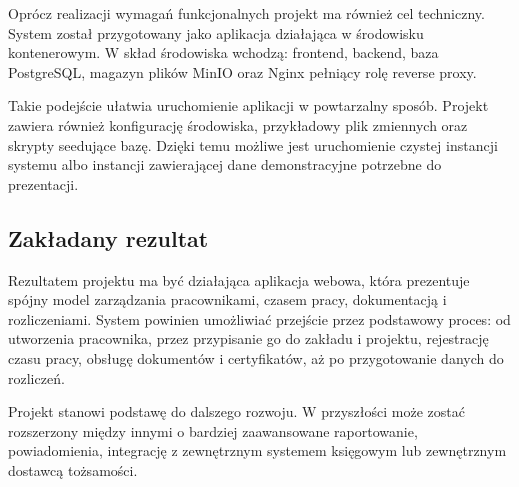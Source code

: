 Oprócz realizacji wymagań funkcjonalnych projekt ma również cel techniczny. System został przygotowany jako aplikacja działająca w środowisku kontenerowym. W skład środowiska wchodzą: frontend, backend, baza PostgreSQL, magazyn plików MinIO oraz Nginx pełniący rolę reverse proxy.

Takie podejście ułatwia uruchomienie aplikacji w powtarzalny sposób. Projekt zawiera również konfigurację środowiska, przykładowy plik zmiennych oraz skrypty seedujące bazę. Dzięki temu możliwe jest uruchomienie czystej instancji systemu albo instancji zawierającej dane demonstracyjne potrzebne do prezentacji.

\subsection{Zakładany rezultat}

Rezultatem projektu ma być działająca aplikacja webowa, która prezentuje spójny model zarządzania pracownikami, czasem pracy, dokumentacją i rozliczeniami. System powinien umożliwiać przejście przez podstawowy proces: od utworzenia pracownika, przez przypisanie go do zakładu i projektu, rejestrację czasu pracy, obsługę dokumentów i certyfikatów, aż po przygotowanie danych do rozliczeń.

Projekt stanowi podstawę do dalszego rozwoju. W przyszłości może zostać rozszerzony między innymi o bardziej zaawansowane raportowanie, powiadomienia, integrację z zewnętrznym systemem księgowym lub zewnętrznym dostawcą tożsamości.